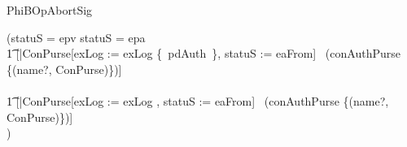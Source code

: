 \begin{LNewSDef}
\begin{schema}{PhiBOpAbortSig}

    
    (\IF statuS = epv \lor statuS = epa \THEN \\
    	\t1 [|\theta ConPurse[exLog := exLog \cup \{~pdAuth~\}, statuS := eaFrom] \notin \ran~(conAuthPurse \oplus \{(name?, \theta ConPurse)\})] \\
    \ELSE \\
    	\t1 [|\theta ConPurse[exLog := exLog \cup \emptyset, statuS := eaFrom] \notin \ran~(conAuthPurse \oplus \{(name?, \theta ConPurse)\})] \\
    )
\end{schema}~\end{LNewSDef}

